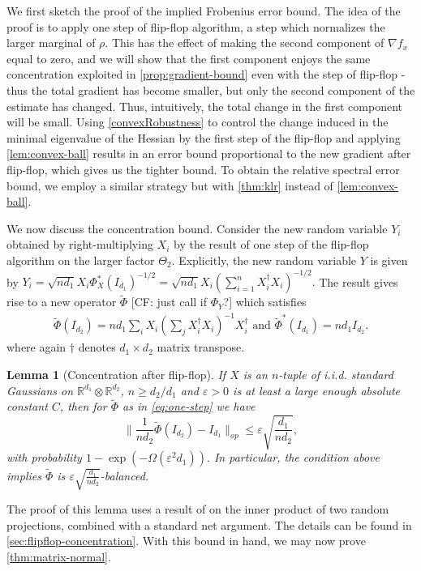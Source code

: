 \documentclass[aos]{imsart}
\newtheorem{lemma}[theorem]{Lemma}
\theoremstyle{definition}
\numberwithin{equation}{section}
\newcommand{\R}{{\mathbb{R}}}
\newcommand{\ot}{\otimes}
\newcommand{\eps}{\varepsilon}
\newcommand{\samp}{x}
\newcommand{\CF}[1]{{\color{purple}[CF: #1]}}
\begin{document}
We first sketch the proof of the implied Frobenius error bound. The idea of the proof is to apply one step of flip-flop algorithm, a step which normalizes the larger marginal of $\rho$. This has the effect of making the second component of $\nabla f_\samp$ equal to zero, and we will show that the first component enjoys the same concentration exploited in \cref{prop:gradient-bound} even with the step of flip-flop - thus the total gradient has become smaller, but only the second component of the estimate has changed. Thus, intuitively, the total change in the first component will be small. Using \cref{convexRobustness} to control the change induced in the minimal eigenvalue of the Hessian by the first step of the flip-flop and applying \cref{lem:convex-ball} results in an error bound proportional to the new gradient after flip-flop, which gives us the tighter bound. To obtain the relative spectral error bound, we employ a similar strategy but with \cref{thm:klr} instead of \cref{lem:convex-ball}.

We now discuss the concentration bound. Consider the new random variable $Y_i$ obtained by right-multiplying $X_i$ by the result of one step of the flip-flop algorithm on the larger factor $\Theta_2$. Explicitly, the new random variable $Y$ is given by
$Y_i =  \sqrt{n d_1} X_i \Phi_X^*(I_{d_1})^{-1/2} =  \sqrt{n d_1} X_i (\sum_{i = 1}^n X_i^\dagger X_i)^{-1/2}.$
The result gives rise to a new operator $\tilde{\Phi}$ \CF{just call if $\Phi_Y$?} which satisfies
\begin{align} \tilde{\Phi}(I_{d_2}) = n d_1 \sum_{i} X_{i} \left( \sum_{j}  X_{i}^{\dagger} X_{i}\right)^{-1} X_{i}^\dagger \textrm{ and } \tilde{\Phi}^*(I_{d_1}) = n d_1 I_{d_2}.   \label{eq:one-step}\end{align}
where again $\dagger$ denotes $d_1\times d_2$ matrix transpose.
\begin{lemma}[Concentration after flip-flop]\label{lem:flipflop-concentration}
If $X$ is an $n$-tuple of i.i.d. standard Gaussians on $\R^{d_1}\ot \R^{d_2}$, $n \geq d_2/d_1$ and $\eps> 0$ is at least a large enough absolute constant $C$, then for $\tilde{\Phi}$ as in \cref{eq:one-step} we have
$$\| \frac{1}{n d_2} \tilde{\Phi}(I_{d_2}) - I_{d_1}\|_{op} \leq \eps \sqrt{ \frac{d_1}{nd_2}},$$
 with probability $1 - \exp(- \Omega( \eps^2 d_{1})).$ In particular, the condition above implies $\tilde{\Phi}$ is $\eps \sqrt{ \frac{d_1}{nd_2}}$-balanced.
\end{lemma}
The proof of this lemma uses a result of \cite{hayden2006aspects} on the inner product of two random projections, combined with a standard net argument. The details can be found in \cref{sec:flipflop-concentration}. With this bound in hand, we may now prove \cref{thm:matrix-normal}.
\end{document}
